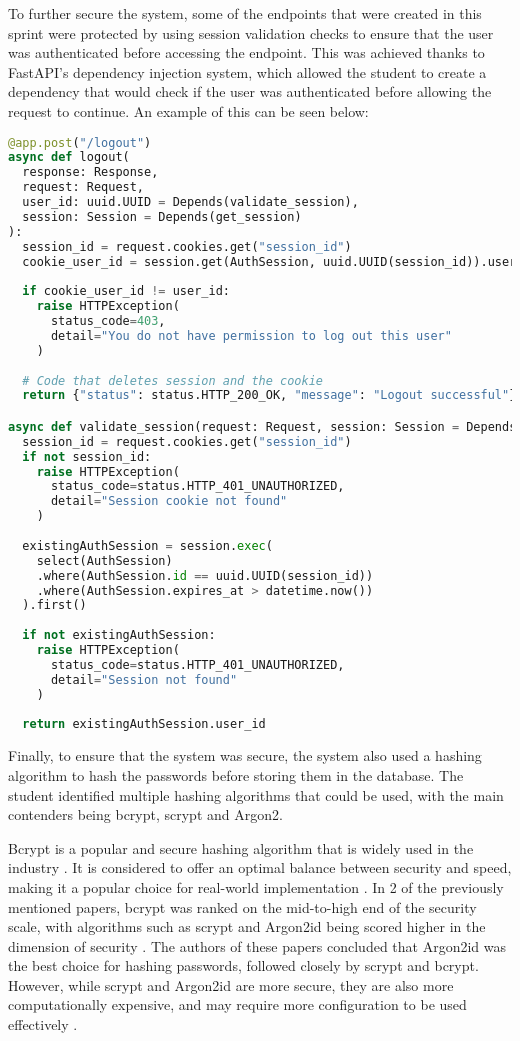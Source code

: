 To further secure the system, some of the endpoints that were created in this sprint were protected by using session validation checks to ensure that the user was authenticated before accessing the endpoint. This was achieved thanks to FastAPI's dependency injection system, which allowed the student to create a dependency that would check if the user was authenticated before allowing the request to continue. An example of this can be seen below:

\begin{lstlisting}[language=Python, caption=FastAPI Dependency for Session Validation]
@app.post("/logout")
async def logout(
  response: Response, 
  request: Request, 
  user_id: uuid.UUID = Depends(validate_session), 
  session: Session = Depends(get_session)
):
  session_id = request.cookies.get("session_id")
  cookie_user_id = session.get(AuthSession, uuid.UUID(session_id)).user_id
  
  if cookie_user_id != user_id:
    raise HTTPException(
      status_code=403, 
      detail="You do not have permission to log out this user"
    )
  
  # Code that deletes session and the cookie
  return {"status": status.HTTP_200_OK, "message": "Logout successful"}

async def validate_session(request: Request, session: Session = Depends(get_session)):
  session_id = request.cookies.get("session_id")
  if not session_id:
    raise HTTPException(
      status_code=status.HTTP_401_UNAUTHORIZED, 
      detail="Session cookie not found"
    )
    
  existingAuthSession = session.exec(
    select(AuthSession)
    .where(AuthSession.id == uuid.UUID(session_id))
    .where(AuthSession.expires_at > datetime.now())
  ).first()
    
  if not existingAuthSession:
    raise HTTPException(
      status_code=status.HTTP_401_UNAUTHORIZED, 
      detail="Session not found"
    )
    
  return existingAuthSession.user_id
\end{lstlisting}

Finally, to ensure that the system was secure, the system also used a hashing algorithm to hash the passwords before storing them in the database. The student identified multiple hashing algorithms that could be used, with the main contenders being bcrypt, scrypt and Argon2. 

Bcrypt is a popular and secure hashing algorithm that is widely used in the industry \parencite{hash3, hash2}. It is considered to offer an optimal balance between security and speed, making it a popular choice for real-world implementation \parencite{hash1}. In 2 of the previously mentioned papers, bcrypt was ranked on the mid-to-high end of the security scale, with algorithms such as scrypt and Argon2id being scored higher in the dimension of security \parencite{hash1, hash3}. The authors of these papers concluded that Argon2id was the best choice for hashing passwords, followed closely by scrypt and bcrypt. However, while scrypt and Argon2id are more secure, they are also more computationally expensive, and may require more configuration to be used effectively \parencite{hash1}.

